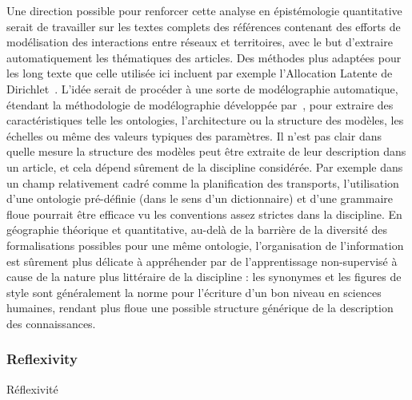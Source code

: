 {Une direction possible pour renforcer cette analyse en épistémologie quantitative serait de travailler sur les textes complets des références contenant des efforts de modélisation des interactions entre réseaux et territoires, avec le but d'extraire automatiquement les thématiques des articles. Des méthodes plus adaptées pour les long texte que celle utilisée ici incluent par exemple l'Allocation Latente de Dirichlet~\cite{blei2003latent}. L'idée serait de procéder à une sorte de modélographie automatique, étendant la méthodologie de modélographie développée par~\cite{schmitt2013modelographie}, pour extraire des caractéristiques telle les ontologies, l'architecture ou la structure des modèles, les échelles ou même des valeurs typiques des paramètres. Il n'est pas clair dans quelle mesure la structure des modèles peut être extraite de leur description dans un article, et cela dépend sûrement de la discipline considérée. Par exemple dans un champ relativement cadré comme la planification des transports, l'utilisation d'une ontologie pré-définie (dans le sens d'un dictionnaire) et d'une grammaire floue pourrait être efficace vu les conventions assez strictes dans la discipline. En géographie théorique et quantitative, au-delà de la barrière de la diversité des formalisations possibles pour une même ontologie, l'organisation de l'information est sûrement plus délicate à appréhender par de l'apprentissage non-supervisé à cause de la nature plus littéraire de la discipline : les synonymes et les figures de style sont généralement la norme pour l'écriture d'un bon niveau en sciences humaines, rendant plus floue une possible structure générique de la description des connaissances.
}






\subsubsection{Reflexivity}{Réflexivité}


